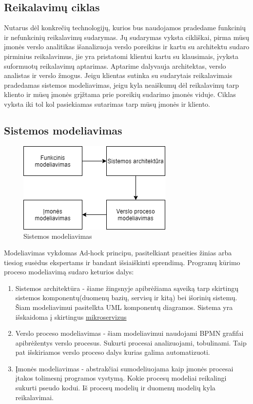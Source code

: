 \documentclass{VUMIFPSkursinis}
\begin{document}
	\subsection{Reikalavimų ciklas}
		Nutarus dėl konkrečių technologijų, kurios bus naudojamos pradedame funkcinių ir nefunkcinių reikalavimų sudarymas. Jų sudarymas vyksta cikliškai, pirma mūsų įmonės verslo analitikas išanalizuoja verslo poreikius ir kartu su architektu sudaro pirminius reikalavimus, jie yra pristatomi klientui kartu su klausimais, įvyksta suformuotų reikalavimų aptarimas. Aptarime dalyvauja architektas, verslo analistas ir verslo žmogus. Jeigu klientas sutinka su sudarytais reikalavimais pradedamas sistemos modeliavimas, jeigu kyla neaiškumų dėl reikalavimų tarp kliento ir mūsų įmonės grįžtama prie poreikių sudarimo įmonės viduje. Ciklas vyksta iki tol kol pasiekiamas sutarimas tarp mūsų įmonės ir kliento.
	\subsection{Sistemos modeliavimas}
	\begin{figure}[H]
	\centering
	\includegraphics[scale=0.7]{img/SistemosModeliavimas}
	\caption{Sistemos modeliavimas} %
	\label{img:mlp}
	\end{figure}
		Modeliavimas vykdomas Ad-hock principu, pasitelkiant praeities žinias arba tiesiog susėdus ekspertams ir bandant išsiaiškinti sprendimą.
		Programų kūrimo proceso modeliavimą sudaro keturios dalys:
		\begin{enumerate}
		\item Sistemos architektūra - šiame žingsnyje apibrėžiama sąveiką tarp skirtingų sistemos komponentų(duomenų bazių, servisų ir kitą) bei išorinių sistemų. Šiam modeliavimui pasitelkta UML komponentų diagramos. Sistema yra išskaidoma į skirtingus \hyperref[mikro]{mikroservizus}
		\item Verslo proceso modeliavimas - šiam modeliavimui naudojami BPMN grafifai apibrėžentys verslo procesus. Sukurti procesai analizuojami, tobulinami. Taip pat išskiriamos verslo proceso dalys kurias galima automatizuoti.
		\item Įmonės modeliavimas - abstrakčiai sumodeliuojama kaip įmonės procesai įtakos tolimesnį programos vystymą. 
			Kokie procesų modeliai reikalingi sukurti pseudo kodui. Iš procesų modelių ir duomenų modelių kyla reikalavimai.
		\end{enumerate}
\end{document}
